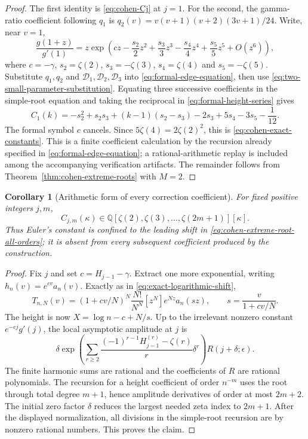 \documentclass[11pt]{article}
\numberwithin{equation}{section}
\newtheorem{corollary}[theorem]{Corollary}
\theoremstyle{definition}
\theoremstyle{remark}
\begin{document}
\begin{proof}
The first identity is \eqref{eq:cohen-Cj} at $j=1$.  For the second,
the gamma-ratio coefficient following $q_1$ is
$q_2(v)=v(v+1)(v+2)(3v+1)/24$.  Write, near $v=1$,
\[
 \frac{g(1+z)}{g'(1)}=z\exp\left(cz-\frac{s_2}2z^2
       +\frac{s_3}3z^3-\frac{s_4}4z^4+\frac{s_5}5z^5+O(z^6)\right),
\]
where $c=-\gamma$, $s_2=\zeta(2)$, $s_3=-\zeta(3)$,
$s_4=\zeta(4)$ and $s_5=-\zeta(5)$.  Substitute $q_1,q_2$ and
$\mathcal D_1,\mathcal D_2,\mathcal D_3$ into
\eqref{eq:formal-edge-equation}, then use
\eqref{eq:two-small-parameter-substitution}.  Equating three successive
coefficients in the simple-root equation and taking the reciprocal
in \eqref{eq:formal-height-series} gives
\[
 C_1(k)=-s_2^2+s_2s_3+(k-1)(s_2-s_3)-2s_3+5s_4-3s_5-\frac1{12}.
\]
The formal symbol $c$ cancels.  Since $5\zeta(4)=2\zeta(2)^2$,
this is \eqref{eq:cohen-exact-constants}.  This is a finite
coefficient calculation by the recursion already specified in
\eqref{eq:formal-edge-equation}; a rational-arithmetic replay is
included among the accompanying verification artifacts.  The
remainder follows from Theorem~\ref{thm:cohen-extreme-roots} with $M=2$.
\end{proof}

\begin{corollary}[Arithmetic form of every correction coefficient]
\label{cor:cohen-coefficient-algebra}
For fixed positive integers $j,m$,
\[
 C_{j,m}(\kappa)\in
   \mathbb Q[\zeta(2),\zeta(3),\ldots,\zeta(2m+1)][\kappa].
\]
Thus Euler's constant is confined to the leading shift in
\eqref{eq:cohen-extreme-root-all-orders}; it is absent from every
subsequent coefficient produced by the construction.
\end{corollary}

\begin{proof}
Fix $j$ and set $c=H_{j-1}-\gamma$.  Extract one more exponential,
writing $h_n(v)=e^{cv}a_n(v)$.  Exactly as in
\eqref{eq:exact-logarithmic-shift},
\[
 T_{n,N}(v)=(1+cv/N)^N
   \frac{N!}{N^N}[z^N]e^{Nz}a_n(sz),\qquad
 s=\frac{v}{1+cv/N}.
\]
The height is now $X=\log n-c+N/s$.  Up to the irrelevant nonzero
constant $e^{-cj}g'(j)$, the local asymptotic amplitude at $j$ is
\[
 \delta\exp\left(\sum_{r\geq2}
    \frac{(-1)^{r-1}H_{j-1}^{(r)}-\zeta(r)}r\delta^r\right)
       R(j+\delta;\epsilon).
\]
The finite harmonic sums are rational and the coefficients of $R$
are rational polynomials.  The recursion for a height coefficient
of order $n^{-m}$ uses the root through total degree $m+1$, hence
amplitude derivatives of order at most $2m+2$.  The initial zero
factor $\delta$ reduces the largest needed zeta index to $2m+1$.
After the displayed normalization, all divisions in the simple-root
recursion are by nonzero rational numbers.  This proves the claim.
\end{proof}
\end{document}
